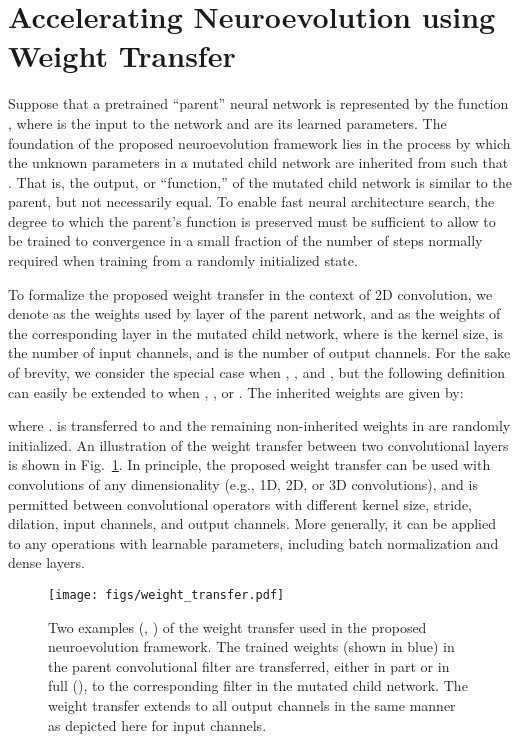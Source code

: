 \documentclass{ieeeaccess}
\newcommand\hl[1]{#1}
\begin{document}
\section{Accelerating Neuroevolution using Weight Transfer}
\label{sec:weight_transfer}
Suppose that a \hl{pretrained ``parent'' neural} network is represented by the function , where  is the input to the network and  are its \hl{learned} parameters. The foundation of the proposed neuroevolution framework lies in the process by which the \hl{unknown} parameters  in a mutated child network  are inherited from  such that . That is, the output, or ``function,'' of the mutated child network is similar to the parent, but not necessarily equal. To enable fast neural architecture search, the degree to which the parent's function is preserved must be sufficient to allow  to be trained to convergence in a small fraction of the number of steps normally required when training from a randomly initialized state. 

To formalize the proposed weight transfer in the context of 2D convolution, we denote  as the weights used by layer  of the parent network, and  as the weights of the corresponding layer in the mutated child network, where  is the kernel size,  is the number of input channels, and  is the number of output channels. For the sake of brevity, we consider the special case when , , and , but the following definition can easily be extended to when , , or . The inherited weights  are given by:

where .  is transferred to  and the remaining non-inherited weights in  are randomly initialized. An illustration of the weight transfer between two convolutional layers is shown in Fig.\ \ref{fig:weight_transfer}. In principle, the proposed weight transfer can be used with convolutions of any dimensionality (e.g., 1D, 2D, or 3D convolutions), and is permitted between convolutional operators with different kernel size, stride, dilation, input channels, and output channels.  More generally, it can be applied to any operations with learnable parameters, including batch normalization and dense layers.

\begin{figure}
\centering
    \texttt{[image: figs/weight\_transfer.pdf]}
\caption{Two examples (, ) of the weight transfer used in the proposed neuroevolution framework. The trained weights (shown in blue) in the parent convolutional filter  are transferred, either in part or in full (), to the corresponding filter  in the mutated child network. The weight transfer extends to all output channels in the same manner as depicted here for input channels.}
\label{fig:weight_transfer}
\end{figure}
\end{document}
